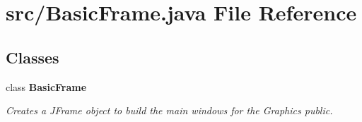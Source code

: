 \section{src/\+Basic\+Frame.java File Reference}
\label{_basic_frame_8java}
\subsection*{Classes}
\begin{DoxyCompactItemize}
\item 
class {\bf Basic\+Frame}
\begin{DoxyCompactList}\small\item\em Creates a J\+Frame object to build the main windows for the Graphics  public. \end{DoxyCompactList}\end{DoxyCompactItemize}
